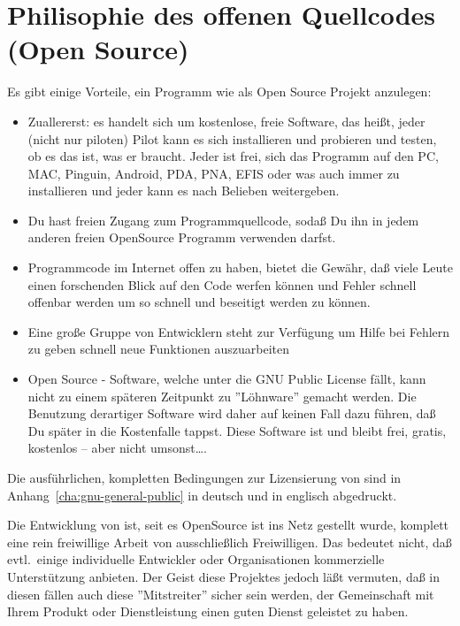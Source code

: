 \section{Philisophie des offenen Quellcodes (Open Source)}

Es gibt einige Vorteile, ein Programm wie \xc als Open Source Projekt anzulegen:

\begin{itemize}
\item Zuallererst: es handelt sich um kostenlose, freie Software, das heißt, jeder (nicht nur piloten) Pilot kann es sich installieren und probieren und testen,
ob es das ist, was er braucht. Jeder ist frei, sich das Programm auf den PC, MAC, Pinguin, Android, PDA, PNA, EFIS  oder was auch immer zu installieren
und jeder kann es nach Belieben weitergeben.

\item Du hast freien Zugang zum Programmquellcode, sodaß Du ihn in jedem anderen freien OpenSource Programm verwenden darfst.

\item Programmcode im Internet offen zu haben, bietet die Gewähr, daß viele Leute einen forschenden Blick auf den Code werfen können und Fehler schnell offenbar 
werden um so schnell und beseitigt werden zu können.

\item  Eine große Gruppe von Entwicklern steht zur Verfügung um Hilfe bei Fehlern zu geben schnell neue Funktionen auszuarbeiten

\item Open Source - Software, welche unter die GNU Public License fällt, kann nicht zu einem späteren Zeitpunkt zu ''Löhnware'' 
gemacht werden. Die Benutzung derartiger Software wird daher auf keinen Fall dazu führen, daß Du später in die Kostenfalle tappst.
Diese Software ist und bleibt frei, gratis, kostenlos -- aber nicht umsonst\dots.

\end{itemize}

Die ausführlichen, kompletten Bedingungen zur Lizensierung von \xc sind in Anhang~\ref{cha:gnu-general-public} in deutsch und in englisch abgedruckt.

Die Entwicklung von \xc ist, seit es OpenSource ist ins Netz gestellt wurde, komplett eine rein freiwillige Arbeit von ausschließlich Freiwilligen.
Das bedeutet nicht, daß evtl.\  einige individuelle Entwickler oder Organisationen  kommerzielle Unterstützung anbieten.
Der Geist diese Projektes jedoch läßt vermuten, daß in diesen fällen auch diese  ''Mitstreiter'' sicher sein werden, der Gemeinschaft
mit Ihrem Produkt oder Dienstleistung einen guten Dienst geleistet zu haben.

